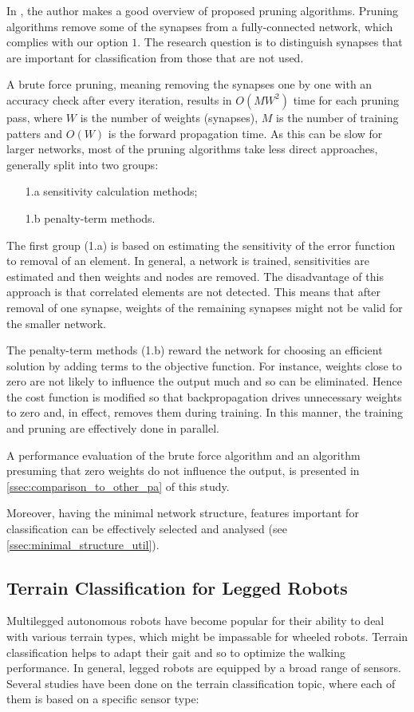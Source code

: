 In \citep{article:10:pa}, the author makes a good overview of proposed pruning algorithms. Pruning algorithms remove some of the synapses from a fully-connected network, which complies with our option $ 1 $. The research question is to distinguish synapses that are important for classification from those that are not used.

A brute force pruning, meaning removing the synapses one by one with an accuracy check after every iteration, results in $ O(MW^2) $ time for each pruning pass, where $ W $ is the number of weights (synapses), $ M $ is the number of training patters and $ O(W) $ is the forward propagation time. As this can be slow for larger networks, most of the pruning algorithms take less direct approaches, generally split into two groups:

\begin{enumerate}
\item[1.a] sensitivity calculation methods;
\item[1.b] penalty-term methods.
\end{enumerate}

The first group (1.a) is based on estimating the sensitivity of the error function to removal of an element. In general, a network is trained, sensitivities are estimated and then weights and nodes are removed. The disadvantage of this approach is that correlated elements are not detected. This means that after removal of one synapse, weights of the remaining synapses might not be valid for the smaller network.

The penalty-term methods (1.b) reward the network for choosing an efficient solution by adding terms to the objective function. For instance, weights close to zero are not likely to influence the output much and so can be eliminated. Hence the cost function is modified so that backpropagation drives unnecessary weights to zero and, in effect, removes them during training. In this manner, the training and pruning are effectively done in parallel.

A performance evaluation of the brute force algorithm and an algorithm presuming that zero weights do not influence the output, is presented in \cref{ssec:comparison_to_other_pa} of this study.

Moreover, having the minimal network structure, features important for classification can be effectively selected and analysed (see \cref{ssec:minimal_structure_util}). 

\subsection*{Terrain Classification for Legged Robots} \label{sec:soa_terrain_classification}
Multilegged autonomous robots have become popular for their ability to deal with various terrain types, which might be impassable for wheeled robots. Terrain classification helps to adapt their gait and so to optimize the walking performance. In general, legged robots are equipped by a broad range of sensors. Several studies have been done on the terrain classification topic, where each of them is based on a specific sensor type:

